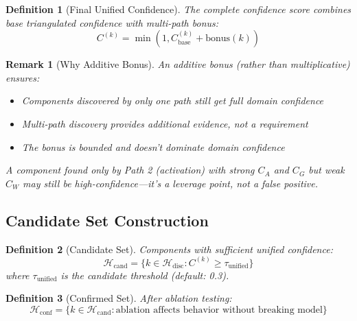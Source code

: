 \documentclass[11pt]{article}
\newtheorem{definition}{Definition}[section]
\newtheorem{remark}{Remark}[section]
\begin{document}
\begin{definition}[Final Unified Confidence]
\label{def:final-unified-confidence}
The complete confidence score combines base triangulated confidence with multi-path bonus:
\begin{equation}
C^{(k)} = \min(1, C^{(k)}_{\text{base}} + \text{bonus}(k))
\end{equation}
\end{definition}

\begin{remark}[Why Additive Bonus]
\label{rem:why-additive-bonus}
An additive bonus (rather than multiplicative) ensures:
\begin{itemize}[nosep]
\item Components discovered by only one path still get full domain confidence
\item Multi-path discovery provides additional evidence, not a requirement
\item The bonus is bounded and doesn't dominate domain confidence
\end{itemize}
A component found only by Path 2 (activation) with strong $C_A$ and $C_G$ but weak $C_W$ may still be high-confidence---it's a leverage point, not a false positive.
\end{remark}

\subsection{Candidate Set Construction}
\label{sec:candidate-set-construction}

\begin{definition}[Candidate Set]
\label{def:candidate-set}
Components with sufficient unified confidence:
\begin{equation}
\mathcal{H}_{\text{cand}} = \{k \in \mathcal{H}_{\text{disc}} : C^{(k)} \geq \tau_{\text{unified}}\}
\end{equation}
where $\tau_{\text{unified}}$ is the candidate threshold (default: 0.3).
\end{definition}

\begin{definition}[Confirmed Set]
\label{def:confirmed-set}
After ablation testing:
\begin{equation}
\mathcal{H}_{\text{conf}} = \{k \in \mathcal{H}_{\text{cand}} : \text{ablation affects behavior without breaking model}\}
\end{equation}
\end{definition}
\end{document}
